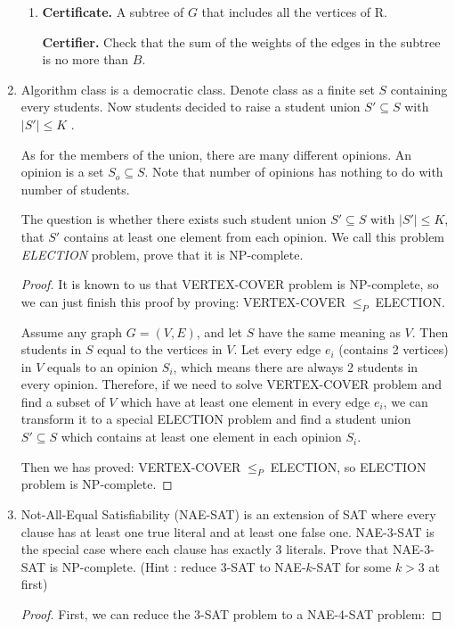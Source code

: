 \documentclass[12pt,a4paper]{article}
\theoremstyle{definition}
\begin{document}
\begin{enumerate}
\begin{enumerate}
		\item
		\textbf{Certificate.} A subtree of $G$ that includes all the vertices of R.
		
		\textbf{Certifier.} Check that the sum of the weights of the edges in the subtree is no more than $B$.
	 \end{enumerate}
	 
	 
	\item Algorithm class is a democratic class. Denote class as a finite set $S$ containing every students. Now students decided to raise a student union $S' \subseteq S$ with $|S'|\leq K$ .
	
	As for the members of the union, there are many different opinions. An opinion is a set $S_o\subseteq S$. Note that number of opinions has nothing to do with number of students.
	
	The question is whether there exists such student union $S' \subseteq S$ with $|S'|\leq K$, that $S'$ contains at least one element from each opinion. We call this problem \emph{ELECTION} problem, prove that it is NP-complete.

	\begin{proof}
		It is known to us that VERTEX-COVER problem is NP-complete, so we can just finish this proof by proving: VERTEX-COVER$\; \leq_P\;$ELECTION. 
		
		Assume any graph $G=(V,E)$, and let $S$ have the same meaning as $V$. Then students in $S$ equal to the vertices in $V$. Let every edge $e_i$ (contains 2 vertices) in $V$ equals to an opinion $S_i$, which means there are always 2 students in every opinion. Therefore, if we need to solve VERTEX-COVER problem and find a subset of $V$ which have at least one element in every edge $e_i$, we can transform it to a special ELECTION problem and find a student union $S'\subseteq S$ which contains at least one element in each opinion $S_i$.
		
		Then we has proved:  VERTEX-COVER$\; \leq_P\;$ELECTION, so ELECTION problem is NP-complete.
		  
	
	\end{proof}

	\item Not-All-Equal Satisfiability (NAE-SAT) is an extension of SAT where every clause has at least one true literal and at least one false one. NAE-$3$-SAT is the special case where each clause has exactly $3$ literals. Prove that NAE-$3$-SAT is NP-complete. (Hint : reduce $3$-SAT to NAE-$k$-SAT for some $k > 3$ at first)
	    \begin{proof}
       First, we can reduce the 3-SAT problem to a NAE-4-SAT problem:
       

\end{proof}
\end{enumerate}
\end{document}
